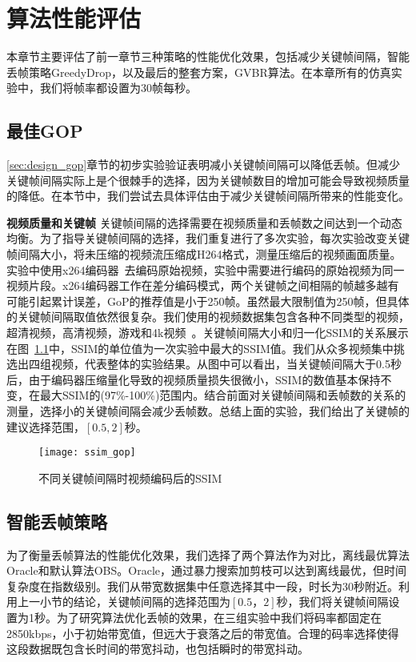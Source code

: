 \chapter{算法性能评估}
本章节主要评估了前一章节三种策略的性能优化效果，包括减少关键帧间隔，智能丢帧策略GreedyDrop，以及最后的整套方案，GVBR算法。在本章所有的仿真实验中，我们将帧率都设置为30帧每秒。

\section{最佳GOP}
\ref{sec:design_gop}章节的初步实验验证表明减小关键帧间隔可以降低丢帧。但减少关键帧间隔实际上是个很棘手的选择，因为关键帧数目的增加可能会导致视频质量的降低。在本节中，我们尝试去具体评估由于减少关键帧间隔所带来的性能变化。

\textbf{视频质量和关键帧} 关键帧间隔的选择需要在视频质量和丢帧数之间达到一个动态均衡。为了指导关键帧间隔的选择，我们重复进行了多次实验，每次实验改变关键帧间隔大小，将未压缩的视频流压缩成H264格式，测量压缩后的视频画面质量。实验中使用x264编码器~\cite{x264}去编码原始视频，实验中需要进行编码的原始视频为同一视频片段。x264编码器工作在差分编码模式，两个关键帧之间相隔的帧越多越有可能引起累计误差，GoP的推荐值是小于250帧。虽然最大限制值为250帧，但具体的关键帧间隔取值依然很复杂。我们使用的视频数据集包含各种不同类型的视频，超清视频，高清视频，游戏和4k视频~\cite{video}。关键帧间隔大小和归一化SSIM的关系展示在图~\ref{fig:ssim_gop}中，SSIM的单位值为一次实验中最大的SSIM值。我们从众多视频集中挑选出四组视频，代表整体的实验结果。从图中可以看出，当关键帧间隔大于0.5秒后，由于编码器压缩量化导致的视频质量损失很微小，SSIM的数值基本保持不变，在最大SSIM的(97\%-100\%)范围内。结合前面对关键帧间隔和丢帧数的关系的测量，选择小的关键帧间隔会减少丢帧数。总结上面的实验，我们给出了关键帧的建议选择范围，$[0.5,2]$秒。

\begin{figure}[htb]%
  \centering
  \texttt{[image: ssim\_gop]}
  \caption{不同关键帧间隔时视频编码后的SSIM}
  \label{fig:ssim_gop}
\end{figure}

\section{智能丢帧策略}
为了衡量丢帧算法的性能优化效果，我们选择了两个算法作为对比，离线最优算法Oracle和默认算法OBS。Oracle，通过暴力搜索加剪枝可以达到离线最优，但时间复杂度在指数级别。我们从带宽数据集中任意选择其中一段，时长为30秒附近。利用上一小节的结论，关键帧间隔的选择范围为$[0.5，2]$秒，我们将关键帧间隔设置为1秒。为了研究算法优化丢帧的效果，在三组实验中我们将码率都固定在2850kbps，小于初始带宽值，但远大于衰落之后的带宽值。合理的码率选择使得这段数据既包含长时间的带宽抖动，也包括瞬时的带宽抖动。


